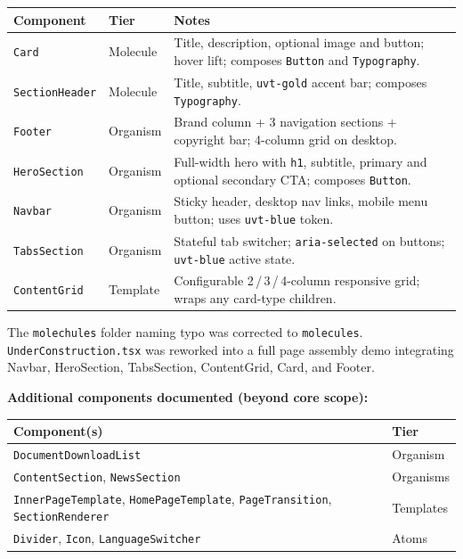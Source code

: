\documentclass[12pt,a4paper]{article}
\begin{document}
\begin{longtable}{@{}L{3.2cm}L{2.2cm}L{7.8cm}@{}}
\toprule
{}
\textbf{Component} & \textbf{Tier} & \textbf{Notes} \\
\midrule
\endhead
\texttt{Card}
    & Molecule
    & Title, description, optional image and button; hover lift; composes
      \texttt{Button} and \texttt{Typography}. \\
\addlinespace
\texttt{SectionHeader}
    & Molecule
    & Title, subtitle, \texttt{uvt-gold} accent bar; composes
      \texttt{Typography}. \\
\addlinespace
\texttt{Footer}
    & Organism
    & Brand column + 3 navigation sections + copyright bar; 4-column
      grid on desktop. \\
\addlinespace
\texttt{HeroSection}
    & Organism
    & Full-width hero with \texttt{h1}, subtitle, primary and optional
      secondary CTA; composes \texttt{Button}. \\
\addlinespace
\texttt{Navbar}
    & Organism
    & Sticky header, desktop nav links, mobile menu button;
      uses \texttt{uvt-blue} token. \\
\addlinespace
\texttt{TabsSection}
    & Organism
    & Stateful tab switcher; \texttt{aria-selected} on buttons;
      \texttt{uvt-blue} active state. \\
\addlinespace
\texttt{ContentGrid}
    & Template
    & Configurable 2\,/\,3\,/\,4-column responsive grid; wraps any
      card-type children. \\
\bottomrule
\end{longtable}

\vspace{0.5em}

The \texttt{molechules} folder naming typo was corrected to \texttt{molecules}.
\texttt{UnderConstruction.tsx} was reworked into a full page assembly demo
integrating Navbar, HeroSection, TabsSection, ContentGrid, Card, and Footer.

\vspace{0.8em}
\noindent\textbf{Additional components documented (beyond core scope):}
\vspace{0.4em}

\begin{longtable}{@{}L{8cm}L{5.2cm}@{}}
\toprule
{}
\textbf{Component(s)} & \textbf{Tier} \\
\midrule
\endhead
\texttt{DocumentDownloadList} & Organism \\
\addlinespace
\texttt{ContentSection}, \texttt{NewsSection} & Organisms \\
\addlinespace
\texttt{InnerPageTemplate}, \texttt{HomePageTemplate},
\texttt{PageTransition}, \texttt{SectionRenderer} & Templates \\
\addlinespace
\texttt{Divider}, \texttt{Icon}, \texttt{LanguageSwitcher} & Atoms \\
\bottomrule
\end{longtable}
\end{document}
